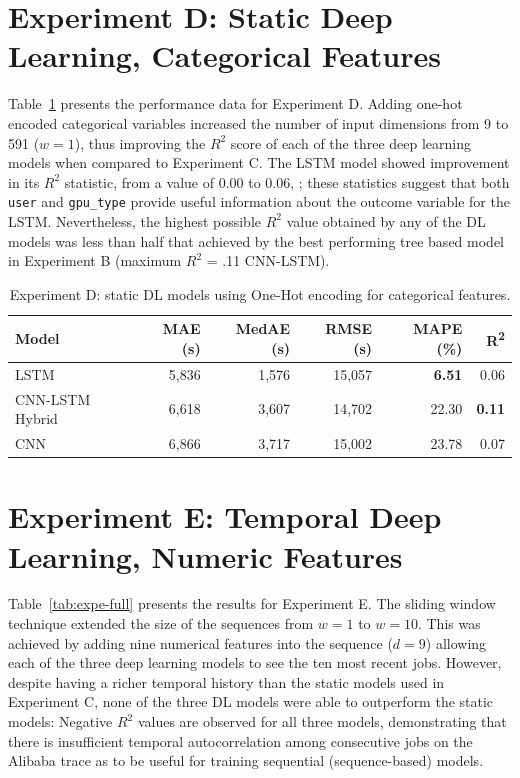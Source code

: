 \clearpage
\section{Experiment D: Static Deep Learning, Categorical Features}

Table~\ref{tab:expd-full} presents the performance data for Experiment D. Adding one-hot encoded categorical variables increased the number of input dimensions from 9 to 591 ($w=1$), thus improving the $R^2$ score of each of the three deep learning models when compared to Experiment C. The LSTM model showed improvement in its $R^2$ statistic, from a value of 0.00 to 0.06, ; these statistics suggest that both \texttt{user} and \texttt{gpu\_type} provide useful information about the outcome variable for the LSTM. Nevertheless, the highest possible $R^2$ value obtained by any of the DL models was less than half that achieved by the best performing tree based model in Experiment B (maximum $R^2$ = .11 CNN-LSTM).

\begin{table}[H]
\centering
\caption[Results for Experiment D]{Experiment D: static DL models using One-Hot encoding for categorical features.}
\label{tab:expd-full}
\begin{tabular}{lrrrrr}
\hline
\textbf{Model} & \textbf{MAE (s)} & \textbf{MedAE (s)} & \textbf{RMSE (s)} & \textbf{MAPE (\%)} & \textbf{R\textsuperscript{2}} \\ 
\hline
LSTM            & 5{,}836 & 1{,}576 & 15{,}057 & \textbf{6.51}  & 0.06 \\ 
CNN-LSTM Hybrid & 6{,}618 & 3{,}607 & 14{,}702 & 22.30 & \textbf{0.11} \\ 
CNN             & 6{,}866 & 3{,}717 & 15{,}002 & 23.78 & 0.07 \\ 
\hline
\end{tabular}
\end{table}

\clearpage
\section{Experiment E: Temporal Deep Learning, Numeric Features}

Table~\ref{tab:expe-full} presents the results for Experiment E. The sliding window technique extended the size of the sequences from $w=1$ to $w=10$. This was achieved by adding nine numerical features into the sequence ($d=9$) allowing each of the three deep learning models to see the ten most recent jobs. However, despite having a richer temporal history than the static models used in Experiment C, none of the three DL models were able to outperform the static models: Negative $R^2$ values are observed for all three models, demonstrating that there is insufficient temporal autocorrelation among consecutive jobs on the Alibaba trace as to be useful for training sequential (sequence-based) models.

